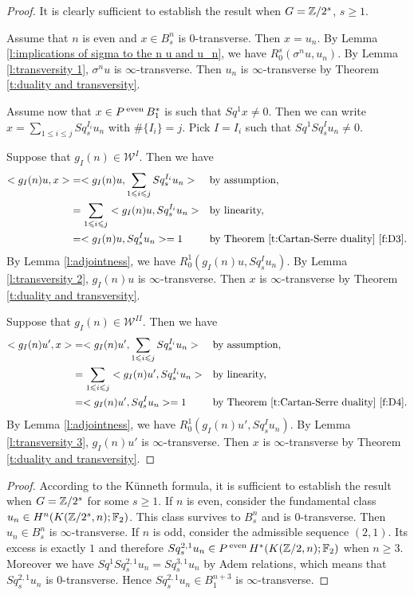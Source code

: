 \begin{proof} %
It is clearly sufficient to establish the result when $G=\Z/2^s$, $s\geq1$.

Assume that $n$ is even and $x\in B^n_s$ is $0$-transverse. Then $x=u_n$. By Lemma \ref{l:implications of sigma to the n u and u_n}, we have $R^s_0(\sigma^n u,u_n)$. By Lemma \ref{l:transversity 1}, $\sigma^n u$ is $\infty$-transverse. Then $u_n$ is $\infty$-transverse by Theorem \ref{t:duality and transversity}. 

Assume now that $x\in P\even B^*_1$ is such that $Sq^1x\not=0$. Then we can write $x=\sum_{1\leq i\leq j}Sq^{I_i}_s u_n$ with $\#\{I_i\}=j$. Pick $I=I_i$ such that $Sq^1Sq^I_s u_n\not=0$. 

Suppose that $g_I(n)\in{\mathcal W}^{I}$. Then we have 
\begin{align*}
<g_I(n)u,x>&=<g_I(n)u,\sum_{1\leq i\leq j}Sq^{I_i}_s u_n> &&\text{by assumption,}\\
&=\sum_{1\leq i\leq j}<g_I(n)u,Sq^{I_i}_s u_n> &&\text{by linearity,}\\
&=<g_I(n)u,Sq^I_s u_n>=1 &&\text{by Theorem \ref{t:Cartan-Serre duality} \eqref{f:D3}.}
\end{align*}
By Lemma \ref{l:adjointness}, we have $R^1_0(g_I(n)u,Sq^I_s u_n)$. By Lemma \ref{l:transversity 2}, $g_I(n)u$ is $\infty$-transverse. Then $x$ is $\infty$-transverse by Theorem \ref{t:duality and transversity}.

Suppose that $g_I(n)\in{\mathcal W}^{II}$. Then we have 
\begin{align*}
<g_I(n)u',x>&=<g_I(n)u',\sum_{1\leq i\leq j}Sq^{I_i}_s u_n> &&\text{by assumption,}\\
&=\sum_{1\leq i\leq j}<g_I(n)u',Sq^{I_i}_s u_n> &&\text{by linearity,}\\
&=<g_I(n)u',Sq^I_s u_n>=1 &&\text{by Theorem \ref{t:Cartan-Serre duality} \eqref{f:D4}.}
\end{align*}
By Lemma \ref{l:adjointness}, we have $R^1_0(g_I(n)u',Sq^I_s u_n)$. By Lemma \ref{l:transversity 3}, $g_I(n)u'$ is $\infty$-transverse. Then $x$ is $\infty$-transverse by Theorem \ref{t:duality and transversity}.
\end{proof}

\begin{cor_Cartan_result}\label{c:Cartan_result}

\end{cor_Cartan_result}

\begin{proof}
According to the K\"unneth formula, it is sufficient to establish the result when $G=\Z/2^s$ for some $s\geq1$. If $n$ is even, consider the fundamental class $u_n\in H^n(K(\Z/2^s,n);\F_2)$. This class survives to $B^n_s$ and is $0$-transverse. Then $u_n\in B^n_s$ is $\infty$-transverse. If $n$ is odd, consider the admissible sequence $(2,1)$. Its excess is exactly $1$ and therefore $Sq^{2,1}_s u_n\in P\even H^*(K(\Z/2,n);\F_2)$ when $n\geq3$. Moreover we have $Sq^1Sq^{2,1}_s u_n=Sq^{3,1}_s u_n$ by Adem relations, which means that $Sq^{2,1}_s u_n$ is $0$-transverse. Hence $Sq^{2,1}_s u_n\in B^{n+3}_1$ is $\infty$-transverse.
\end{proof}

